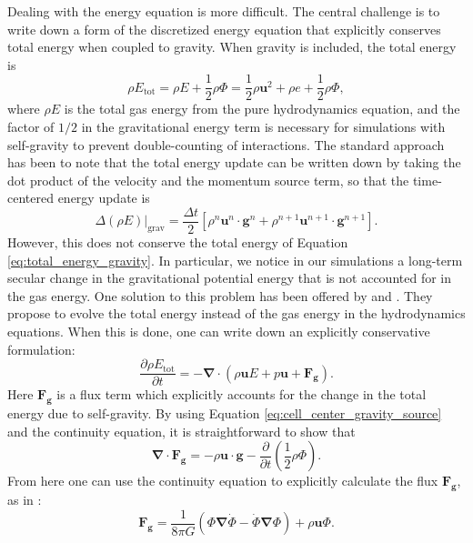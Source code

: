 \documentclass[iop]{emulateapj}
\begin{document}
Dealing with the energy equation is more difficult. The central
challenge is to write down a form of the discretized energy equation
that explicitly conserves total energy when coupled to gravity. When
gravity is included, the total energy is
\begin{equation}
  \rho E_{\text{tot}} = \rho E + \frac{1}{2}\rho\Phi = \frac{1}{2}\rho \mathbf{u}^2 + \rho e + \frac{1}{2}\rho\Phi, \label{eq:total_energy_gravity}
\end{equation}
where $\rho E$ is the total gas energy from the pure hydrodynamics equation,
and the factor of $1/2$ in the gravitational energy term is necessary
for simulations with self-gravity to prevent double-counting of
interactions. The standard approach has been to note that the total energy update
can be written down by taking the dot product of the velocity and the momentum source term,
so that the time-centered energy update is
\begin{equation}
  \left.\Delta (\rho E)\right|_\text{grav} = \frac{\Delta t}{2} \left[ \rho^n \mathbf{u}^n \cdot \mathbf{g}^n + \rho^{n+1} \mathbf{u}^{n+1} \cdot \mathbf{g}^{n+1}\right].
\end{equation}
However, this does not conserve the total energy of Equation \ref{eq:total_energy_gravity}.
In particular, we notice in our simulations a long-term secular change in the gravitational potential energy
that is not accounted for in the gas energy. One solution to this problem has been offered by 
\cite{jiang:2013} and \cite{marcello:2012}. They propose to evolve the total energy instead of the gas energy 
in the hydrodynamics equations. When this is done, one can write down an explicitly conservative 
formulation:
\begin{equation}
  \frac{\partial \rho E_{\text{tot}}}{\partial t} = -\bm{\nabla}\cdot(\rho\mathbf{u}E + p\mathbf{u} + \mathbf{F_g}).
\end{equation}
Here $\mathbf{F_g}$ is a flux term which explicitly accounts for the change in the total energy due to self-gravity. 
By using Equation \ref{eq:cell_center_gravity_source} and the continuity equation, it is straightforward to show that
\begin{equation}
  {\bm\nabla} \cdot \mathbf{F_g} = -\rho \mathbf{u} \cdot \mathbf{g} - \frac{\partial}{\partial t}\left(\frac{1}{2}\rho\Phi\right). \label{eq:gradient_F_g}
\end{equation}
From here one can use the continuity equation to explicitly calculate the flux $\mathbf{F_g}$, as in \cite{jiang:2013}:
\begin{equation}
  \mathbf{F_g} = \frac{1}{8\pi G}\left(\Phi\bm{\nabla}\dot{\Phi} - \dot{\Phi}\bm{\nabla}\Phi\right) + \rho\mathbf{u}\Phi \label{eq:jiang_flux}.
\end{equation}
\end{document}

